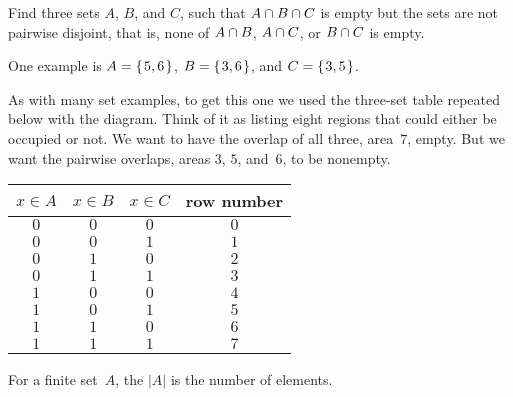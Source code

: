 \documentclass{ibl}  %
\begin{document}
\begin{problem}
  Find three sets $A$, $B$, and $C$, such that 
  $A\cap B\cap C$ is empty but the sets are
  not pairwise disjoint, that is, none of $A\cap B$, 
  $A\cap C$, or $B\cap C$ is empty. 
\begin{answer}
  One example is $A=\mbox{$\{\hspace{0.1em}5,6\hspace{0.1em}\}$}$, $B=\mbox{$\{\hspace{0.1em}3,6\hspace{0.1em}\}$}$, and 
  $C=\mbox{$\{\hspace{0.1em}3,5\hspace{0.1em}\}$}$.

  \remark
  As with many set examples, 
  to get this one we used the three-set table repeated below with
  the diagram.
  Think of it as listing eight regions that could either be occupied or not.
  We want to have the overlap of all three, area~$7$, empty.
  But we want the pairwise overlaps, areas $3$, $5$, and~$6$, to 
  be nonempty.
  \begin{center} \small
    \begin{tabular}{ccc|c}
      $x\in A$  &$x\in B$  &$x\in C$  &row number \\ \hline
         $0$    &$0$       &$0$       &$0$    \\
         $0$    &$0$       &$1$       &$1$    \\
         $0$    &$1$       &$0$       &$2$    \\
         $0$    &$1$       &$1$       &$3$    \\[.5ex]
         $1$    &$0$       &$0$       &$4$    \\
         $1$    &$0$       &$1$       &$5$    \\
         $1$    &$1$       &$0$       &$6$    \\
         $1$    &$1$       &$1$       &$7$    
    \end{tabular}
    \hspace*{3em}
  \end{center}
\end{answer}
\end{problem}

\begin{df}
For a finite set~$A$, the  $|A|$ is the number of elements.
\end{df}

\end{document}
